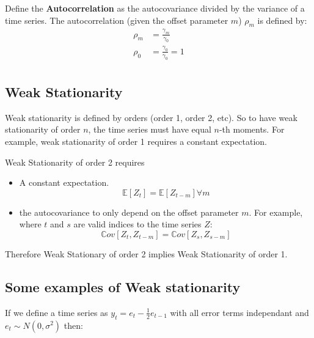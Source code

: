 Define the \textbf{Autocorrelation} as the autocovariance divided by the
variance of a time series. The autocorrelation (given the offset parameter
$m$) $\rho_m$ is defined by:
\begin{equation*}
    \begin{aligned}
        \rho_m &= \frac{\gamma_m}{\gamma_0} \\
        \rho_0 &= \frac{\gamma_0}{\gamma_0} = 1 \\
    \end{aligned}
\end{equation*}


\subsection{Weak Stationarity}

Weak stationarity is defined by orders (order 1, order 2, etc). So to have weak
stationarity of order $n$, the time series must have equal $n$-th moments.
For example, weak stationarity of order 1 requires a constant expectation.

Weak Stationarity of order 2 requires 
\begin{itemize}
    \item A constant expectation.
    \begin{equation*}
        \mathbb{E}[Z_t] = \mathbb{E}[Z_{t-m}]  \forall m
    \end{equation*}
        
    \item the autocovariance to only depend on the offset parameter $m$. For
        example, where $t$ and $s$ are valid indices to the time series $Z$:
    \begin{equation*}
        \mathbb{C}ov[Z_t, Z_{t-m}] = \mathbb{C}ov[Z_s, Z_{s-m}] 
    \end{equation*}
\end{itemize}
Therefore Weak Stationary of order 2 implies Weak Stationarity of order 1.

\subsection{Some examples of Weak stationarity}
If we define a time series as $y_t = e_t - \frac{1}{2}e_{t-1}$ with all error
terms independant and $e_t \sim N(0, \sigma^2)$ then:

